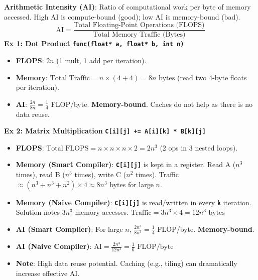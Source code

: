\documentclass[10pt, a4paper]{article}
\newcommand{\cmd}[1]{\texttt{\textbf{#1}}}
\begin{document}
\begin{multicols}{3}
\textbf{Arithmetic Intensity (AI)}:
Ratio of computational work per byte of memory accessed. High AI is compute-bound (good); low AI is memory-bound (bad).
$$ \text{AI} = \frac{\text{Total Floating-Point Operations (FLOPS)}}{\text{Total Memory Traffic (Bytes)}} $$
\textbf{Ex 1: Dot Product} \cmd{func(float* a, float* b, int n)}
\begin{itemize}[nosep] %
    \item \textbf{FLOPS}: $2n$ (1 mult, 1 add per iteration).
    \item \textbf{Memory}: $ \text{Total Traffic} = n \times (4+4) = 8n \text{ bytes} $ (read two 4-byte floats per iteration).
    \item \textbf{AI}: $\frac{2n}{8n} = \frac{1}{4}$ FLOP/byte. \textbf{Memory-bound}. Caches do not help as there is no data reuse.
\end{itemize}

\vspace{1em} %

\textbf{Ex 2: Matrix Multiplication} \cmd{C[i][j] += A[i][k] * B[k][j]}
\begin{itemize}[nosep] %
    \item \textbf{FLOPS}: $ \text{Total FLOPS} = n \times n \times n \times 2 = 2n^3 $ (2 ops in 3 nested loops).
    \item \textbf{Memory (Smart Compiler)}: \cmd{C[i][j]} is kept in a register. Read A ($n^3$ times), read B ($n^3$ times), write C ($n^2$ times). Traffic $\approx (n^3 + n^3 + n^2) \times 4 \approx 8n^3$ bytes for large $n$.
    \item \textbf{Memory (Naive Compiler)}: \cmd{C[i][j]} is read/written in every \cmd{k} iteration. Solution notes $3n^3$ memory accesses.
    $ \text{Traffic} = 3n^3 \times 4 = 12n^3 \text{ bytes} $
    \item \textbf{AI (Smart Compiler)}: For large $n$, $\frac{2n^3}{8n^3} = \frac{1}{4}$ FLOP/byte. \textbf{Memory-bound}.
    \item \textbf{AI (Naive Compiler)}: $ \text{AI} = \frac{2n^3}{12n^3} = \frac{1}{6} \text{ FLOP/byte} $
    \item \textbf{Note}: High data reuse potential. Caching (e.g., tiling) can dramatically increase effective AI.
\end{itemize}


\end{multicols}
\end{document}
